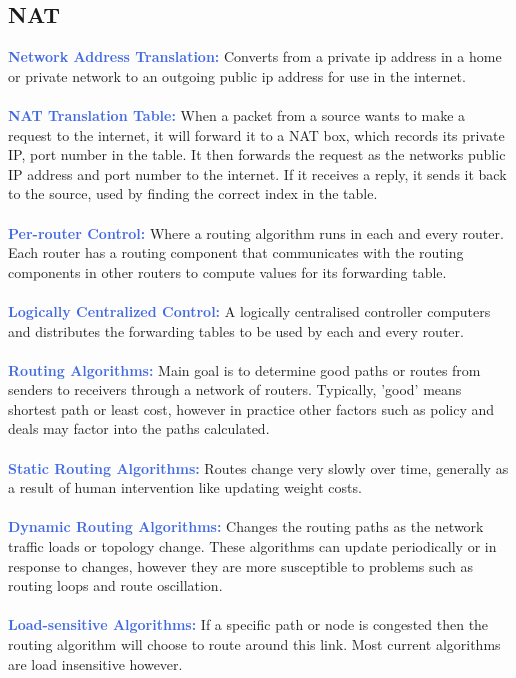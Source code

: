 \documentclass[]{article}
\begin{document}
\subsection{NAT}
\textcolor{RoyalBlue}{\textbf{Network Address Translation:}} Converts from a private ip address in a home or private network to an outgoing public ip address for use in the internet. \\\\
\textcolor{RoyalBlue}{\textbf{NAT Translation Table:}} When a packet from a source wants to make a request to the internet, it will forward it to a NAT box, which records its private IP, port number in the table. It then forwards the request as the networks public IP address and port number to the internet. If it receives a reply, it sends it back to the source, used by finding the correct index in the table.\\\\
\textcolor{RoyalBlue}{\textbf{Per-router Control:}} Where a routing algorithm runs in each and every router. Each router has a routing component that communicates with the routing components in other routers to compute values for its forwarding table. \\\\
\textcolor{RoyalBlue}{\textbf{Logically Centralized Control:}} A logically centralised controller computers and distributes the forwarding tables to be used by each and every router. \\\\
\textcolor{RoyalBlue}{\textbf{Routing Algorithms:}} Main goal is to determine good paths or routes from senders to receivers through a network of routers. Typically, 'good' means shortest path or least cost, however in practice other factors such as policy and deals may factor into the paths calculated. \\\\
\textcolor{RoyalBlue}{\textbf{Static Routing Algorithms:}} Routes change very slowly over time, generally as a result of human intervention like updating weight costs. \\\\
\textcolor{RoyalBlue}{\textbf{Dynamic Routing Algorithms:}} Changes the routing paths as the network traffic loads or topology change. These algorithms can update periodically or in response to changes, however they are more susceptible to problems such as routing loops and route oscillation. \\\\
\textcolor{RoyalBlue}{\textbf{Load-sensitive Algorithms:}} If a specific path or node is congested then the routing algorithm will choose to route around this link. Most current algorithms are load insensitive however. \\\\
\end{document}
